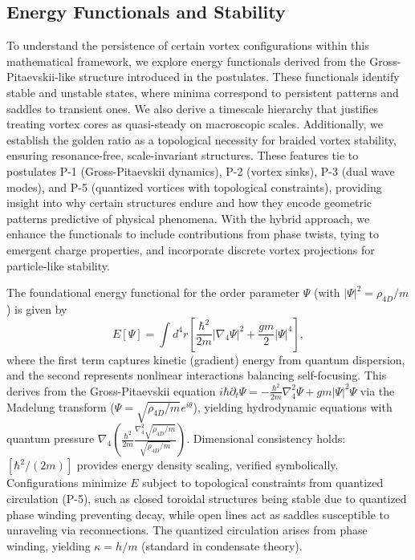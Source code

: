 \subsection{Energy Functionals and Stability}

To understand the persistence of certain vortex configurations within this mathematical framework, we explore energy functionals derived from the Gross-Pitaevskii-like structure introduced in the postulates. These functionals identify stable and unstable states, where minima correspond to persistent patterns and saddles to transient ones. We also derive a timescale hierarchy that justifies treating vortex cores as quasi-steady on macroscopic scales. Additionally, we establish the golden ratio as a topological necessity for braided vortex stability, ensuring resonance-free, scale-invariant structures. These features tie to postulates P-1 (Gross-Pitaevskii dynamics), P-2 (vortex sinks), P-3 (dual wave modes), and P-5 (quantized vortices with topological constraints), providing insight into why certain structures endure and how they encode geometric patterns predictive of physical phenomena. With the hybrid approach, we enhance the functionals to include contributions from phase twists, tying to emergent charge properties, and incorporate discrete vortex projections for particle-like stability.

The foundational energy functional for the order parameter $\Psi$ (with $|\Psi|^2 = \rho_{4D}/m$) is given by
\begin{equation}
E[\Psi] = \int d^4 r \left[ \frac{\hbar^2}{2m} |\nabla_4 \Psi|^2 + \frac{g m}{2} |\Psi|^4 \right],
\end{equation}
where the first term captures kinetic (gradient) energy from quantum dispersion, and the second represents nonlinear interactions balancing self-focusing. This derives from the Gross-Pitaevskii equation $i \hbar \partial_t \Psi = -\frac{\hbar^2}{2 m} \nabla_4^2 \Psi + g m |\Psi|^2 \Psi$ via the Madelung transform ($\Psi = \sqrt{\rho_{4D}/m} e^{i \theta}$), yielding hydrodynamic equations with quantum pressure $\nabla_4 \left( \frac{\hbar^2}{2 m} \frac{\nabla_4^2 \sqrt{\rho_{4D}/m}}{\sqrt{\rho_{4D}/m}} \right)$. Dimensional consistency holds: $[\hbar^2 / (2m)]$ provides energy density scaling, verified symbolically. Configurations minimize $E$ subject to topological constraints from quantized circulation (P-5), such as closed toroidal structures being stable due to quantized phase winding preventing decay, while open lines act as saddles susceptible to unraveling via reconnections. The quantized circulation arises from phase winding, yielding $\kappa = h / m$ (standard in condensate theory).

